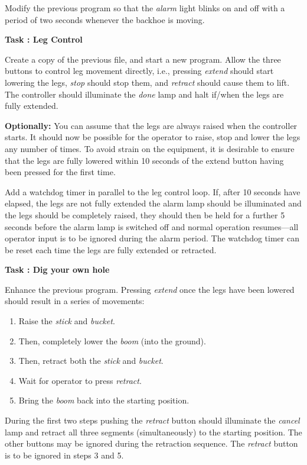 \documentclass[12pt]{article}
\newcounter{task}
\newcommand{\nexttask}[1]{%
	\addtocounter{task}{1}%
	\textbf{\large{}Task \thetask: #1\ }\rule{0em}{4ex}}
\begin{document}
Modify the previous program so that the \emph{alarm} light blinks on and off 
with a period of two seconds whenever the backhoe is moving.

\nexttask{Leg Control} %

Create a copy of the previous file, and start a new program.
Allow the three buttons to control leg movement directly, i.e., pressing 
\emph{extend} should start lowering the legs, \emph{stop} should stop them, 
and \emph{retract} should cause them to lift.
The controller should illuminate the \emph{done} lamp and halt if/when the 
legs are fully extended.

\textbf{Optionally:}
You can assume that the legs are always raised when the controller starts.
It should now be possible for the operator to raise, stop and lower the legs 
any number of times.
To avoid strain on the equipment, it is desirable to ensure that the legs 
are fully lowered within 10 seconds of the extend button having been pressed 
for the first time.

Add a watchdog timer in parallel to the leg control loop.
If, after 10 seconds have elapsed, the legs are not fully extended the alarm 
lamp should be illuminated and the legs should be completely raised, they 
should then be held for a further 5 seconds before the alarm lamp is 
switched off and normal operation resumes---all operator
input is to be ignored during the alarm period.
The watchdog timer can be reset each time the legs are fully extended or 
retracted.

\nexttask{Dig your own hole} %

Enhance the previous program.
Pressing \emph{extend} once the legs have been lowered should result in a 
series of movements:
\begin{enumerate}
\item Raise the \emph{stick} and \emph{bucket}.
\item Then, completely lower the \emph{boom} (into the ground).
\item Then, retract both the \emph{stick} and \emph{bucket}.
\item Wait for operator to press \emph{retract}.
\item Bring the \emph{boom} back into the starting position.
\end{enumerate}

During the first two steps pushing the \emph{retract} button should 
illuminate the \emph{cancel} lamp and retract all three segments 
(simultaneously) to the starting position.
The other buttons may be ignored during the retraction sequence.
The \emph{retract} button is to be ignored in steps 3 and 5.
\end{document}
